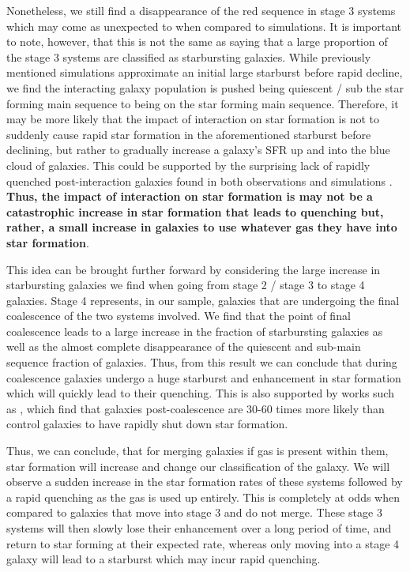 \documentclass[fleqn,usenatbib]{mnras}
\begin{document}
Nonetheless, we still find a disappearance of the red sequence in stage 3 systems which may come as unexpected to when compared to simulations. It is important to note, however, that this is not the same as saying that a large proportion of the stage 3 systems are classified as starbursting galaxies. While previously mentioned simulations approximate an initial large starburst before rapid decline, we find the interacting galaxy population is pushed being quiescent / sub the star forming main sequence to being on the star forming main sequence. Therefore, it may be more likely that the impact of interaction on star formation is not to suddenly cause rapid star formation in the aforementioned starburst before declining, but rather to gradually increase a galaxy's SFR up and into the blue cloud of galaxies. This could be supported by the surprising lack of rapidly quenched post-interaction galaxies found in both observations \citep{2017ApJ...845..145W} and simulations \citep{2020MNRAS.493.3716H, 2021MNRAS.504.1888Q}. \textbf{Thus, the impact of interaction on star formation is may not be a catastrophic increase in star formation that leads to quenching but, rather, a small increase in galaxies to use whatever gas they have into star formation}. %

This idea can be brought further forward by considering the large increase in starbursting galaxies we find when going from stage 2 / stage 3 to stage 4 galaxies. Stage 4 represents, in our sample, galaxies that are undergoing the final coalescence of the two systems involved. We find that the point of final coalescence leads to a large increase in the fraction of starbursting galaxies as well as the almost complete disappearance of the quiescent and sub-main sequence fraction of galaxies. Thus, from this result we can conclude that during coalescence galaxies undergo a huge starburst and enhancement in star formation which will quickly lead to their quenching. This is also supported by works such as \citet{2022MNRAS.517L..92E}, which find that galaxies post-coalescence are 30-60 times more likely than control galaxies to have rapidly shut down star formation.

Thus, we can conclude, that for merging galaxies if gas is present within them, star formation will increase and change our classification of the galaxy. We will observe a sudden increase in the star formation rates of these systems followed by a rapid quenching as the gas is used up entirely. This is completely at odds when compared to galaxies that move into stage 3 and do not merge. These stage 3 systems will then slowly lose their enhancement over a long period of time, and return to star forming at their expected rate, whereas only moving into a stage 4 galaxy will lead to a starburst which may incur rapid quenching.
\end{document}

